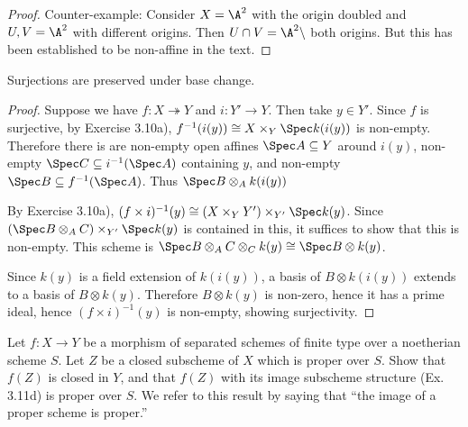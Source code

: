 \begin{proof}

	Counter-example: Consider $X =\A^2 $ with the origin doubled and $U,V = \A^2$ with different origins.
	Then $U\cap V = \A^2 \setminus $ both origins.
	But this has been established to be non-affine in the text.
\end{proof}

\begin{lem}\label{lem:surjbasechange}
	Surjections are preserved under base change.
\end{lem}
\begin{proof}
	Suppose we have $f: X \twoheadrightarrow Y $ and $i: Y' \to Y $.
	Then take $y\in Y' $.
	Since $f $ is surjective, by Exercise 3.10a), $f^{-1}(i(y)) \cong X \times_{Y} \Spec k(i(y)) $ is non-empty.
	Therefore there is are non-empty open affines $\Spec A \subseteq Y $ around $i(y) $, non-empty $\Spec C \subseteq i^{-1}(\Spec A) $ containing $y $, and non-empty $\Spec B \subseteq f^{-1}(\Spec A) $.
	Thus $\Spec B \otimes_A k(i(y))$

	By Exercise 3.10a), $(f \times i)^{-1}(y) \cong (X \times_Y Y') \times_{Y'} \Spec k(y)$.
	Since $(\Spec B \otimes_A C) \times_{Y'} \Spec k(y)$ is contained in this, it suffices to show that this is non-empty.
	This scheme is $\Spec B \otimes_A C \otimes_C k(y) \cong \Spec B \otimes k(y)$.

	Since $k(y) $ is a field extension of $k(i(y)) $, a basis of $B \otimes k(i(y)) $ extends to a basis of $B \otimes k(y) $.
	Therefore $B \otimes k(y) $ is non-zero, hence it has a prime ideal, hence $(f \times i)^{-1}(y) $ is non-empty, showing surjectivity.
\end{proof}
\begin{exercise}
	Let $f: X \to Y$ be a morphism of separated schemes of finite type over a noetherian scheme $S$. Let $Z$ be a closed subscheme of $X$ which is proper over $S$. Show that $f(Z)$ is closed in $Y$, and that $f(Z)$ with its image subscheme structure (Ex. 3.11d) is proper over $S$. We refer to this result by saying that ``the image of a proper scheme is proper.''
	\fi
\end{exercise}
